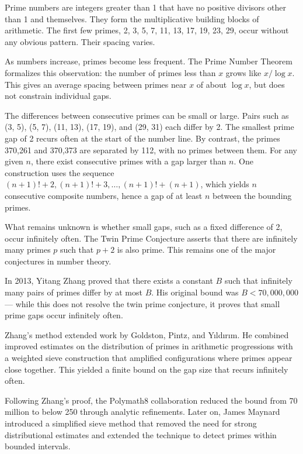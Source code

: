 Prime numbers are integers greater than 1 that have no positive divisors other than 1 and themselves. They form the multiplicative building blocks of arithmetic. The first few primes, 2, 3, 5, 7, 11, 13, 17, 19, 23, 29, occur without any obvious pattern. Their spacing varies.

As numbers increase, primes become less frequent. The Prime Number Theorem formalizes this observation: the number of primes less than $x$ grows like $x / \log x$. This gives an average spacing between primes near $x$ of about $\log x$, but does not constrain individual gaps.

The differences between consecutive primes can be small or large. Pairs such as (3, 5), (5, 7), (11, 13), (17, 19), and (29, 31) each differ by 2. The smallest prime gap of 2 recurs often at the start of the number line. By contrast, the primes 370,261 and 370,373 are separated by 112, with no primes between them. For any given $n$, there exist consecutive primes with a gap larger than $n$. One construction uses the sequence $(n+1)! + 2,  (n+1)! + 3,  \dots,  (n+1)! + (n+1)$, which yields $n$ consecutive composite numbers, hence a gap of at least $n$ between the bounding primes.

What remains unknown is whether small gaps, such as a fixed difference of 2, occur infinitely often. The Twin Prime Conjecture asserts that there are infinitely many primes $p$ such that $p + 2$ is also prime. This remains one of the major conjectures in number theory.

In 2013, Yitang Zhang proved that there exists a constant $B$ such that infinitely many pairs of primes differ by at most $B$. His original bound was $B < 70{,}000{,}000$ — while this does not resolve the twin prime conjecture, it proves that small prime gaps occur infinitely often.

Zhang's method extended work by Goldston, Pintz, and Yıldırım. He combined improved estimates on the distribution of primes in arithmetic progressions with a weighted sieve construction that amplified configurations where primes appear close together. This yielded a finite bound on the gap size that recurs infinitely often.

Following Zhang's proof, the Polymath8 collaboration reduced the bound from 70 million to below 250 through analytic refinements. Later on, James Maynard introduced a simplified sieve method that removed the need for strong distributional estimates and extended the technique to detect primes within bounded intervals.

